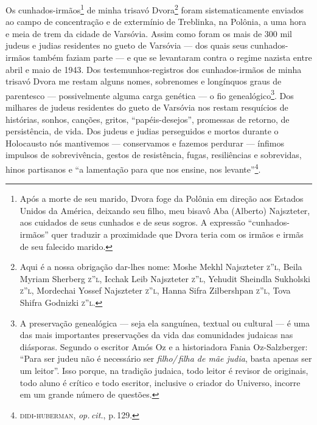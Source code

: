 Os cunhados-irmãos\footnote{Após a morte de seu marido, Dvora foge da
  Polônia em direção aos Estados Unidos da América, deixando seu filho,
  meu bisavô Aba (Alberto) Najszteter, aos cuidados de seus cunhados e
  de seus sogros. A expressão ``cunhados-irmãos'' quer traduzir a
  proximidade que Dvora teria com os irmãos e irmãs de seu falecido
  marido.} de minha trisavó Dvora\footnote{Aqui é a nossa obrigação
  dar-lhes nome: Moshe Mekhl Najszteter \textsc{z''l}, Beila Myriam
  Sherberg \textsc{z''l}, Icchak Leib Najszteter \textsc{z''l}, Yehudit
  Sheindla Sukholski \textsc{z''l}, Mordechai Yossef Najszteter
  \textsc{z''l}, Hanna Sifra Zilbershpan \textsc{z''l}, Tova Shifra Godnizki
  \textsc{z''l}.} foram sistematicamente enviados ao campo de concentração
e de extermínio de Treblinka, na Polônia, a uma hora e meia de trem da
cidade de Varsóvia. Assim como foram os mais de 300 mil judeus e judias
residentes no gueto de Varsóvia --- dos quais seus cunhados-irmãos
também faziam parte --- e que se levantaram contra o regime nazista
entre abril e maio de 1943. Dos testemunhos-registros dos
cunhados-irmãos de minha trisavó Dvora me restam alguns nomes,
sobrenomes e longínquos graus de parentesco --- possivelmente alguma
carga genética --- o fio genealógico\footnote{A preservação genealógica
  --- seja ela sanguínea, textual ou cultural --- é uma das mais
  importantes preservações da vida das comunidades judaicas nas
  diásporas. Segundo o escritor Amós Oz e a historiadora Fania Oz-Salzberger:
  ``Para ser judeu não é necessário ser \emph{filho/\,filha de mãe judia},
  basta apenas ser um leitor''. Isso porque, na tradição judaica, todo
  leitor é revisor de originais, todo aluno é crítico e todo escritor,
  inclusive o criador do Universo, incorre em um grande número de
  questões.}. Dos milhares de judeus residentes do gueto de Varsóvia nos
restam resquícios de histórias, sonhos, canções,
gritos, ``papéis-desejos'', promessas de retorno, de persistência,
de vida. Dos judeus e judias perseguidos e mortos durante o Holocausto
nós mantivemos --- conservamos e fazemos perdurar --- ínfimos impulsos
de sobrevivência, gestos de resistência, fugas, resiliências e
sobrevidas, hinos partisanos e ``a lamentação para que nos
ensine, nos levante''\footnote{\textsc{didi-huberman}, \emph{op.\,cit.}, p.\,129.}.

